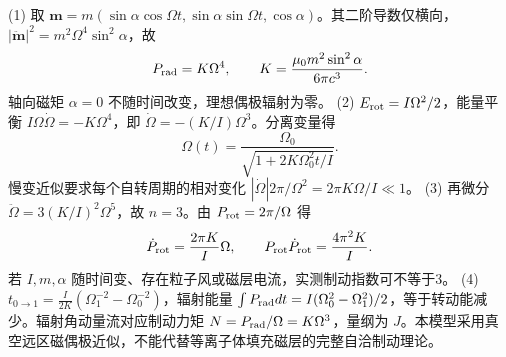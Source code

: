 (1) 取 \(\boldsymbol m=m(\sin\alpha\cos\Omega t,\sin\alpha\sin\Omega t,\cos\alpha)\)。其二阶导数仅横向，\(|\ddot{\boldsymbol m}|^2=m^2\Omega^4\sin^2\alpha\)，故
\[
P_{\rm rad}=K\Omega^4,\qquad K=\frac{\mu_0m^2\sin^2\alpha}{6\pi c^3}.
\]
轴向磁矩 \(\alpha=0\) 不随时间改变，理想偶极辐射为零。
(2) \(E_{\rm rot}=I\Omega^2/2\)，能量平衡 \(I\Omega\dot\Omega=-K\Omega^4\)，即 \(\dot\Omega=-(K/I)\Omega^3\)。分离变量得
\[
\Omega(t)=\frac{\Omega_0}{\sqrt{1+2K\Omega_0^2t/I}}.
\]
慢变近似要求每个自转周期的相对变化 \(|\dot\Omega|2\pi/\Omega^2=2\pi K\Omega/I\ll1\)。
(3) 再微分 \(\ddot\Omega=3(K/I)^2\Omega^5\)，故 \(n=3\)。由 \(P_{\rm rot}=2\pi/\Omega\) 得
\[
\dot P_{\rm rot}=\frac{2\pi K}{I}\Omega,\qquad P_{\rm rot}\dot P_{\rm rot}=\frac{4\pi^2K}{I}.
\]
若 \(I,m,\alpha\) 随时间变、存在粒子风或磁层电流，实测制动指数可不等于3。
(4) \(t_{0\to1}=\frac I{2K}(\Omega_1^{-2}-\Omega_0^{-2})\)，辐射能量 \(\int P_{\rm rad}dt=I(\Omega_0^2-\Omega_1^2)/2\)，等于转动能减少。辐射角动量流对应制动力矩 \(N=P_{\rm rad}/\Omega=K\Omega^3\)，量纲为 \(J\)。本模型采用真空远区磁偶极近似，不能代替等离子体填充磁层的完整自洽制动理论。
